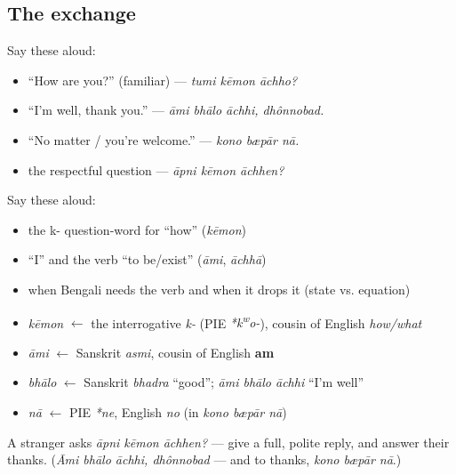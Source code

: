 \subsection*{The exchange}
Say these aloud:

\begin{itemize}
\raggedright
  \item \textquotedblleft{}How are you?\textquotedblright{} (familiar) — \emph{tumi kēmon āchho?}
  \item \textquotedblleft{}I'm well, thank you.\textquotedblright{} — \emph{āmi bhālo āchhi, dhônnobad.}
  \item \textquotedblleft{}No matter / you're welcome.\textquotedblright{} — \emph{kono bæpār nā.}
  \item the respectful question — \emph{āpni kēmon āchhen?}
\end{itemize}

\begin{cousinweb}
Say these aloud:

\begin{itemize}
\raggedright
  \item the k- question-word for \textquotedblleft{}how\textquotedblright{} (\emph{kēmon})
  \item \textquotedblleft{}I\textquotedblright{} and the verb \textquotedblleft{}to be/exist\textquotedblright{} (\emph{āmi}, \emph{āchhā})
  \item when Bengali needs the verb and when it drops it (state vs. equation)
\end{itemize}
\end{cousinweb}

\begin{grammarlens}[title={What you've built — roots you now carry}]
\begin{itemize}
\raggedright
  \item \emph{kēmon} $\leftarrow$ the interrogative \emph{k-} (PIE \emph{*k\textsuperscript{w}o-}), cousin of English \emph{how/what}
  \item \emph{āmi} $\leftarrow$ Sanskrit \emph{asmi}, cousin of English \textbf{am}
  \item \emph{bhālo} $\leftarrow$ Sanskrit \emph{bhadra} \textquotedblleft{}good\textquotedblright{}; \emph{āmi bhālo āchhi} \textquotedblleft{}I'm well\textquotedblright{}
  \item \emph{nā} $\leftarrow$ PIE \emph{*ne}, English \emph{no} (in \emph{kono bæpār nā})
\end{itemize}
\end{grammarlens}

\begin{tcolorbox}[breakable,colback=teal!4,colframe=teal!35!black,title={Before you move on}]
A stranger asks \emph{āpni kēmon āchhen?} — give a full, polite reply, and answer their thanks. (\emph{Āmi bhālo āchhi, dhônnobad} — and to thanks, \emph{kono bæpār nā}.)
\end{tcolorbox}
